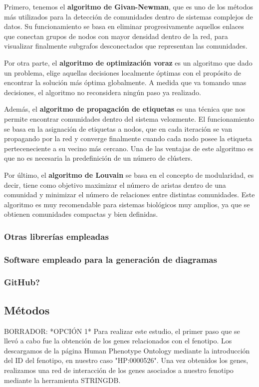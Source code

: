 Primero, tenemos el \textbf{algoritmo de Givan-Newman}, que es uno de los métodos más utilizados para la detección de comunidades dentro de sistemas complejos de datos. Su funcionamiento se basa en eliminar progresivamente aquellos enlaces que conectan grupos de nodos con mayor densidad dentro de la red, para visualizar finalmente subgrafos desconectados que representan las comunidades.

Por otra parte, el \textbf{algoritmo de optimización voraz} es un algoritmo que dado un problema, elige aquellas decisiones localmente óptimas con el propósito de encontrar la solución más óptima globalmente. A medida que va tomando unas decisiones, el algoritmo no reconsidera ningún paso ya realizado.

Además, el \textbf{algoritmo de propagación de etiquetas} es una técnica que nos permite encontrar comunidades dentro del sistema velozmente. El funcionamiento se basa en la asignación de etiquetas a nodos, que en cada iteración se van propagando por la red y converge finalmente cuando cada nodo posee la etiqueta perteceneciente a su vecino más cercano. Una de las ventajas de este algoritmo es que no es necesaria la predefinición de un número de clústers.

Por último, el \textbf{algoritmo de Louvain} se basa en el concepto de modularidad, es decir, tiene como objetivo maximizar el número de aristas dentro de una comunidad y minimizar el número de relaciones entre distintas comunidades. Este algoritmo es muy recomendable para sistemas biológicos muy amplios, ya que se obtienen comunidades compactas y bien definidas.

\subsubsection{Otras librerías empleadas}

\subsubsection{Software empleado para la generación de diagramas}

\subsubsection{GitHub?}

\vspace{3pt}
\subsection{Métodos}
BORRADOR:
*OPCIÓN 1*
Para realizar este estudio, el primer paso que se llevó a cabo fue la obtención de los genes relacionados con el fenotipo. Los descargamos de la página Human Phenotype Ontology mediante la introducción del ID del fenotipo, en nuestro caso "HP:0000526". Una vez obtenidos los genes, realizamos una red de interacción de los genes asociados a nuestro fenotipo mediante la herramienta STRINGDB.

